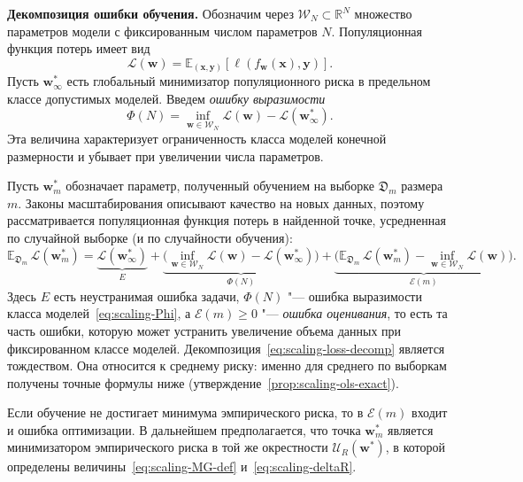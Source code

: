 \textbf{Декомпозиция ошибки обучения.} Обозначим через $\mathcal W_N \subset \mathbb R^N$ множество параметров модели с фиксированным числом параметров $N$. Популяционная функция потерь имеет вид
\begin{equation}
    \mathcal L(\mathbf w)
    =
    \mathbb E_{(\mathbf x, \mathbf y)}[\ell(f_{\mathbf w}(\mathbf x), \mathbf y)].
\end{equation}
Пусть $\mathbf w_{\infty}^*$ есть глобальный минимизатор популяционного риска в предельном классе допустимых моделей. Введем \emph{ошибку выразимости}
\begin{equation}
    \label{eq:scaling-Phi}
    \Phi(N)
    =
    \inf_{\mathbf w \in \mathcal W_N}
    \mathcal L(\mathbf w)
    -
    \mathcal L(\mathbf w_{\infty}^*).
\end{equation}
Эта величина характеризует ограниченность класса моделей конечной размерности и убывает при увеличении числа параметров.

Пусть $\mathbf w_m^*$ обозначает параметр, полученный обучением на выборке $\mathfrak D_m$ размера $m$. Законы масштабирования описывают качество на новых данных, поэтому рассматривается популяционная функция потерь в найденной точке, усредненная по случайной выборке (и по случайности обучения):
\begin{equation}
    \label{eq:scaling-loss-decomp}
    \mathbb E_{\mathfrak D_m}\,\mathcal L(\mathbf w_m^*)
    =
    \underbrace{\mathcal L(\mathbf w_{\infty}^*)}_{E}
    +
    \underbrace{\Big(\inf_{\mathbf w \in \mathcal W_N}\mathcal L(\mathbf w)-\mathcal L(\mathbf w_{\infty}^*)\Big)}_{\Phi(N)}
    +
    \underbrace{\Big(\mathbb E_{\mathfrak D_m}\,\mathcal L(\mathbf w_m^*)-\inf_{\mathbf w \in \mathcal W_N}\mathcal L(\mathbf w)\Big)}_{\mathcal E(m)}.
\end{equation}
Здесь $E$ есть неустранимая ошибка задачи, $\Phi(N)$ "--- ошибка выразимости класса моделей~\eqref{eq:scaling-Phi}, а $\mathcal E(m) \geqslant 0$ "--- \emph{ошибка оценивания}, то есть та часть ошибки, которую может устранить увеличение объема данных при фиксированном классе моделей. Декомпозиция~\eqref{eq:scaling-loss-decomp} является тождеством. Она относится к среднему риску: именно для среднего по выборкам получены точные формулы ниже (утверждение~\ref{prop:scaling-ols-exact}).

\begin{remark}
    Если обучение не достигает минимума эмпирического риска, то в $\mathcal E(m)$ входит и ошибка оптимизации. В дальнейшем предполагается, что точка $\mathbf w_m^*$ является минимизатором эмпирического риска в той же окрестности $\mathcal U_R(\mathbf w^*)$, в которой определены величины~\eqref{eq:scaling-MG-def} и~\eqref{eq:scaling-deltaR}.
\end{remark}

